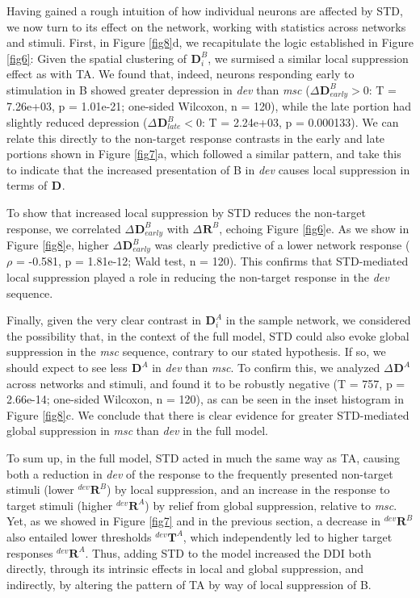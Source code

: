 \documentclass[pdflatex,referee,iicol,sn-basic]{sn-jnl}
\newcommand{\dev}{\textit{dev}}
\newcommand{\msc}{\textit{msc}}
\renewcommand{\R}[3][]{{}^{#1}_{}\!\mathbf{R}^{#2}_{#3}}
\renewcommand{\T}[3][]{{}^{#1}_{}\mathbf{T}^{#2}_{#3}}
\newcommand{\D}[3][]{{}^{#1}_{}\!\mathbf{D}^{#2}_{#3}}
\theoremstyle{thmstyleone}%
\theoremstyle{thmstyletwo}%
\theoremstyle{thmstylethree}%
\begin{document}
Having gained a rough intuition of how individual neurons are affected by STD, we now turn to its effect on the network, working with statistics across networks and stimuli. First, in Figure \ref{fig8}d, we recapitulate the logic established in Figure \ref{fig6}: Given the spatial clustering of $\D{B}{i}$, we surmised a similar local suppression effect as with TA. We found that, indeed, neurons responding early to stimulation in B showed greater depression in \dev{} than \msc{} ($\Delta \D{B}{early} > 0$: T = 7.26e+03, p = 1.01e-21; one-sided Wilcoxon, n = 120), while the late portion had slightly reduced depression ($\Delta \D{B}{late} < 0$: T = 2.24e+03, p = 0.000133). We can relate this directly to the non-target response contrasts in the early and late portions shown in Figure \ref{fig7}a, which followed a similar pattern, and take this to indicate that the increased presentation of B in \dev{} causes local suppression in terms of $\D{}{}$. %

To show that increased local suppression by STD reduces the non-target response, we correlated $\Delta \D{B}{early}$ with $\Delta \R{B}{}$, echoing Figure \ref{fig6}e. As we show in Figure \ref{fig8}e, higher $\Delta \D{B}{early}$ was clearly predictive of a lower network response ($\rho$ = -0.581, p = 1.81e-12; Wald test, n = 120). This confirms that STD-mediated local suppression played a role in reducing the non-target response in the \dev{} sequence.

Finally, given the very clear contrast in $\D{A}{i}$ in the sample network, we considered the possibility that, in the context of the full model, STD could also evoke global suppression in the \msc{} sequence, contrary to our stated hypothesis. If so, we should expect to see less $\D{A}{}$ in \dev{} than \msc{}. To confirm this, we analyzed $\Delta \D{A}{}$ across networks and stimuli, and found it to be robustly negative (T = 757, p = 2.66e-14; one-sided Wilcoxon, n = 120), as can be seen in the inset histogram in Figure \ref{fig8}c. We conclude that there is clear evidence for greater STD-mediated global suppression in \msc{} than \dev{} in the full model.

To sum up, in the full model, STD acted in much the same way as TA, causing both a reduction in \dev{} of the response to the frequently presented non-target stimuli (lower $\R[dev]{B}{}$) by local suppression, and an increase in the response to target stimuli (higher $\R[dev]{A}{}$) by relief from global suppression, relative to \msc{}. Yet, as we showed in Figure \ref{fig7} and in the previous section, a decrease in $\R[dev]{B}{}$ also entailed lower thresholds $\T[dev]{A}{}$, which independently led to higher target responses $\R[dev]{A}{}$. Thus, adding STD to the model increased the DDI both directly, through its intrinsic effects in local and global suppression, and indirectly, by altering the pattern of TA by way of local suppression of B.
\end{document}
